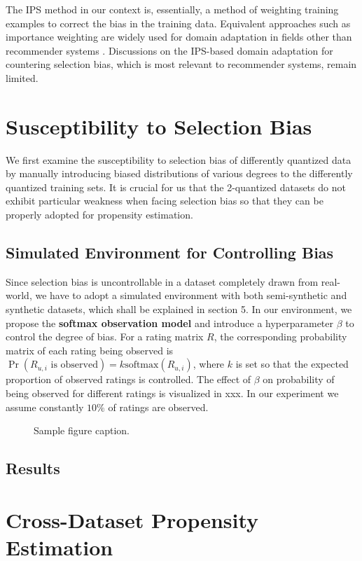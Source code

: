 \documentclass{article}
\begin{document}
The IPS method in our context is, essentially, a method of weighting training examples to correct the bias in the training data. Equivalent approaches such as importance weighting are widely used for domain adaptation in fields other than recommender systems \cite{sugiyama2007covariate} \cite{zhang2018importance}. Discussions on the IPS-based domain adaptation for countering selection bias, which is most relevant to recommender systems, remain limited.

\section{Susceptibility to Selection Bias}
We first examine the susceptibility to selection bias of differently quantized data by manually introducing biased distributions of various degrees to the differently quantized training sets. It is crucial for us that the 2-quantized datasets do not exhibit particular weakness when facing selection bias so that they can be properly adopted for propensity estimation.

\subsection{Simulated Environment for Controlling Bias}
Since selection bias is uncontrollable in a dataset completely drawn from real-world, we have to adopt a simulated environment \cite{krauth2020offline} with both semi-synthetic and synthetic datasets, which shall be explained in section 5. In our environment, we propose the \textbf{softmax observation model} and introduce a hyperparameter $\beta$ to control the degree of bias. For a rating matrix $R$, the corresponding probability matrix of each rating being observed is $\Pr(R_{u,i}\text{ is observed}) = k\text{softmax}(R_{u,i})$, where $k$ is set so that the expected proportion of observed ratings is controlled. The effect of $\beta$ on probability of being observed for different ratings is visualized in xxx. In our experiment we assume constantly $10\%$ of ratings are observed.
\begin{figure}
  \centering
  \fbox{\rule[-.5cm]{0cm}{4cm} \rule[-.5cm]{4cm}{0cm}}
  \caption{Sample figure caption.}
\end{figure}

\subsection{Results}

\section{Cross-Dataset Propensity Estimation}
\end{document}
